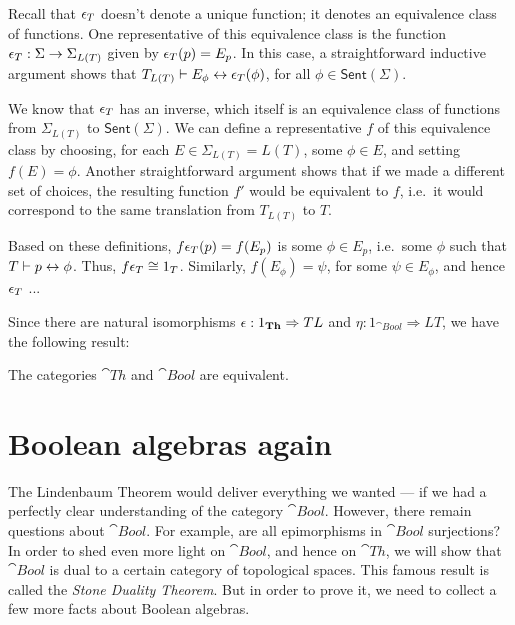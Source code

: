 \begin{disc} Recall that $\epsilon _T$ doesn't denote a unique function; it
  denotes an equivalence class of functions.  One representative of
  this equivalence class is the function $\epsilon _T:\Sigma\to \Sigma
  _{L(T)}$ given by $\epsilon _T(p)=E_p$.  In this case, a straightforward
  inductive argument shows that $T_{L(T)}\vdash E_\phi \leftrightarrow \epsilon
  _T(\phi )$, for all $\phi\in\mathsf{Sent}(\Sigma )$.

  We know that $\epsilon _T$ has an inverse, which itself is an equivalence
  class of functions from $\Sigma _{L(T)}$ to $\mathsf{Sent}(\Sigma
  )$.  We can define a representative $f$ of this equivalence class by
  choosing, for each $E\in \Sigma _{L(T)}=L(T)$, some $\phi\in E$, and
  setting $f(E)=\phi$.  Another straightforward argument shows that if
  we made a different set of choices, the resulting function $f'$
  would be equivalent to $f$, i.e.\ it would correspond to the same
  translation from $T_{L(T)}$ to $T$.

  Based on these definitions, $f\epsilon _T(p)=f(E_p)$ is some $\phi \in
  E_p$, i.e.\ some $\phi$ such that $T\vdash p\leftrightarrow \phi$.  Thus, $f\epsilon
  _T\cong 1_T$.  Similarly, $f(E_\phi )=\psi$, for some $\psi \in
  E_\phi$, and hence $\epsilon _T$ ...    
\end{disc}

\bigskip Since there are natural isomorphisms $\epsilon
:1_{\mathbf{Th}}\Rightarrow TL$ and $\eta :1_{\cat{Bool}}\Rightarrow LT$,
we have the following result:

\begin{box-thm} The categories $\cat{Th}$ and
  $\cat{Bool}$ are equivalent.  \end{box-thm}


\section{Boolean algebras again}

The Lindenbaum Theorem would deliver everything we wanted --- if we
had a perfectly clear understanding of the category $\cat{Bool}$.
However, there remain questions about $\cat{Bool}$.  For example, are
all epimorphisms in $\cat{Bool}$ surjections?  In order to shed even
more light on $\cat{Bool}$, and hence on $\cat{Th}$, we will show that
$\cat{Bool}$ is dual to a certain category of topological spaces.
This famous result is called the \emph{Stone Duality Theorem}.  But in
order to prove it, we need to collect a few more facts about Boolean
algebras.

